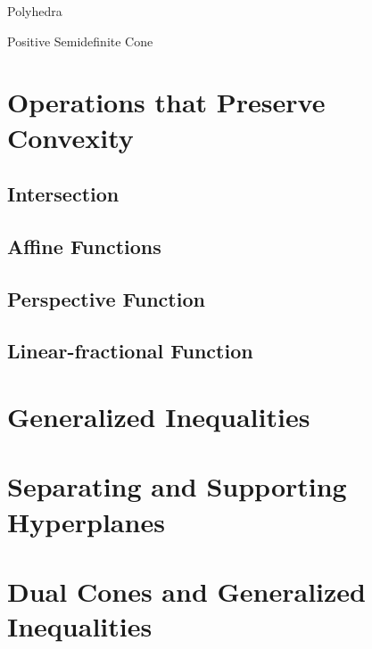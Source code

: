 \begin{definition}{Polyhedra}{}
    
\end{definition}

\begin{definition}{Positive Semidefinite Cone}{}
    
\end{definition}

\section{Operations that Preserve Convexity}

\subsection{Intersection}

\subsection{Affine Functions}

\subsection{Perspective Function}

\subsection{Linear-fractional Function}

\section{Generalized Inequalities}

\section{Separating and Supporting Hyperplanes}

\section{Dual Cones and Generalized Inequalities}